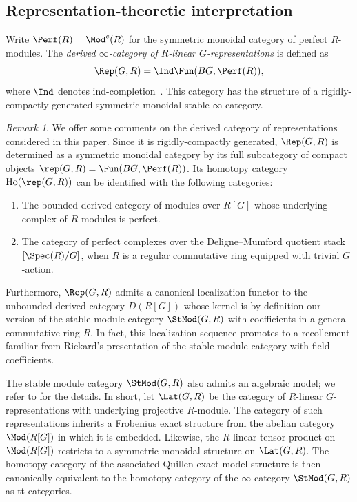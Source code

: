 \documentclass{amsart}%
\numberwithin{equation}{section}%
\theoremstyle{remark}
\newtheorem{Rem}[subsection]{Remark}
\newcounter{enum-resume-hack}
\begin{document}
\subsection{Representation-theoretic interpretation}\label{ssec:derreptheory}

Write $\Perf(R) = \Mod^c(R)$ for the symmetric monoidal category of perfect $R$-modules. The \emph{derived $\infty$-category of $R$-linear $G$-representations} is defined as
\[
\Rep(G,R) = \Ind\Fun(BG,\Perf(R)),
\]
where $\Ind$ denotes ind-completion~\cite[\S5.3.5]{HTTLurie}. This category has the structure of a rigidly-compactly generated symmetric monoidal stable $\infty$-category. 

\begin{Rem}\label{rem:incarnations}
We offer some comments on the derived category of representations considered in this paper. Since it is rigidly-compactly generated, $\Rep(G,R)$ is determined as a symmetric monoidal category by its full subcategory of compact objects $\rep(G,R) = \Fun(BG,\Perf(R))$. Its homotopy category $\mathrm{Ho}(\rep(G,R))$ can be identified with the following categories:
    \begin{enumerate}
        \item The bounded derived category of modules over $R[G]$ whose underlying complex of $R$-modules is perfect. 
        \item The category of perfect complexes over the Deligne--Mumford quotient stack $[\Spec(R)/G]$, when $R$ is a regular commutative ring equipped with trivial $G$-action.
    \end{enumerate}
Furthermore, $\Rep(G,R)$ admits a canonical localization functor to the unbounded derived category $D(R[G])$ whose kernel is by definition our version of the stable module category $\StMod(G,R)$ with coefficients in a general commutative ring $R$. In fact, this localization sequence promotes to a recollement familiar from Rickard's presentation of the stable module category with field coefficients. 

The stable module category $\StMod(G,R)$ also admits an algebraic model; we refer to \cite[Sec.~3.3]{barthel_integral1} for the details. In short, let $\Lat(G,R)$ be the category of $R$-linear $G$-representations with underlying projective $R$-module. The category of such representations inherits a Frobenius exact structure from the abelian category $\Mod(R[G])$ in which it is embedded. Likewise, the $R$-linear tensor product on $\Mod(R[G])$ restricts to a symmetric monoidal structure on $\Lat(G,R)$. The homotopy category of the associated Quillen exact model structure is then canonically equivalent to the homotopy category of the $\infty$-category $\StMod(G,R)$ as tt-categories.
\end{Rem}
\end{document}
